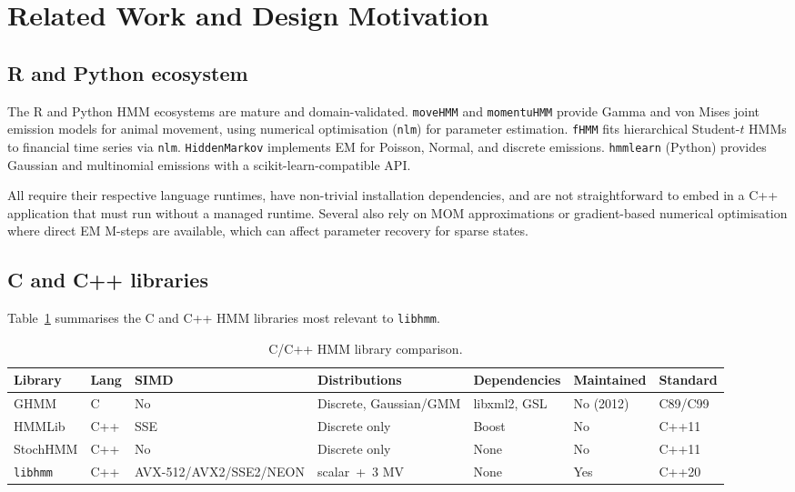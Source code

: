 \documentclass[11pt]{article}
\begin{document}
\section{Related Work and Design Motivation}
\label{sec:relatedwork}

\subsection{R and Python ecosystem}

The R and Python HMM ecosystems are mature and domain-validated.
\texttt{moveHMM} \citep{Michelot2016} and \texttt{momentuHMM}
\citep{McClintock2018} provide Gamma and von Mises joint emission models
for animal movement, using numerical optimisation (\texttt{nlm}) for
parameter estimation.
\texttt{fHMM} \citep{Oelschlager2024} fits hierarchical Student-$t$ HMMs
to financial time series via \texttt{nlm}.
\texttt{HiddenMarkov} \citep{Harte2025} implements EM for Poisson, Normal,
and discrete emissions.
\texttt{hmmlearn} (Python) provides Gaussian and multinomial emissions with
a scikit-learn-compatible API.

All require their respective language runtimes, have non-trivial installation
dependencies, and are not straightforward to embed in a C++ application that
must run without a managed runtime.
Several also rely on MOM approximations or gradient-based numerical
optimisation where direct EM M-steps are available, which can affect
parameter recovery for sparse states.

\subsection{C and C++ libraries}
\label{sec:cpp_libs}

Table~\ref{tab:cpp_comparison} summarises the C and C++ HMM libraries
most relevant to \texttt{libhmm}.

\begin{table}[!ht]
\centering
\footnotesize
\caption{C/C++ HMM library comparison.}
\label{tab:cpp_comparison}
\begin{tabular}{ll
  >{\raggedright\arraybackslash}p{2.4cm}
  >{\raggedright\arraybackslash}p{3.2cm}
  l l l}
\toprule
Library & Lang & SIMD & Distributions & Dependencies & Maintained & Standard \\
\midrule
GHMM    & C    & No   & Discrete, Gaussian/GMM & libxml2, GSL & No (2012) & C89/C99 \\
HMMLib  & C++  & SSE  & Discrete only  & Boost        & No         & C++11   \\
StochHMM & C++ & No  & Discrete only  & None         & No         & C++11   \\
\texttt{libhmm} & C++ & AVX-512/AVX2/\newline SSE2/NEON & 16 scalar~+~3 MV & None & Yes & C++20 \\
\bottomrule
\end{tabular}
\end{table}
\end{document}
